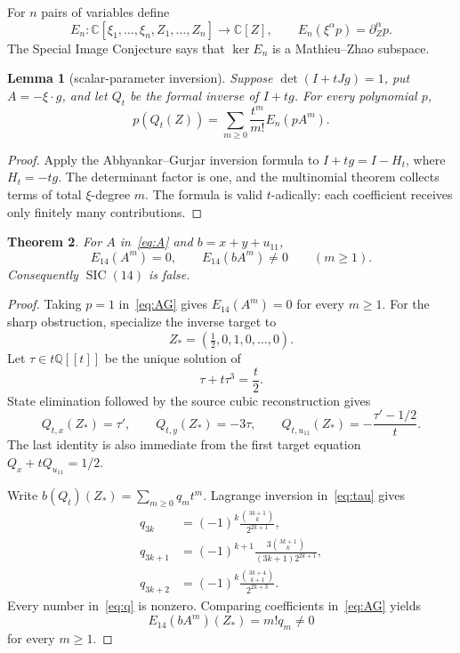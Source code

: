 \documentclass[11pt]{article}
\newtheorem{theorem}{Theorem}
\newtheorem{lemma}[theorem]{Lemma}
\newcommand{\C}{\mathbb C}
\newcommand{\Q}{\mathbb Q}
\newcommand{\SIC}{\operatorname{SIC}}
\begin{document}
For $n$ pairs of variables define
\[
 E_n:\C[\xi_1,\ldots,\xi_n,Z_1,\ldots,Z_n]\longrightarrow\C[Z],
 \qquad E_n(\xi^\alpha p)=\partial_Z^\alpha p.
\]
The Special Image Conjecture says that $\ker E_n$ is a Mathieu--Zhao
subspace.

\begin{lemma}[scalar-parameter inversion]\label{lem:inverse}
Suppose $\det(I+tJg)=1$, put $A=-\xi\cdot g$, and let $Q_t$ be the formal
inverse of $I+tg$.  For every polynomial $p$,
\begin{equation}
 p(Q_t(Z))=\sum_{m\geq0}\frac{t^m}{m!}E_n(pA^m). \label{eq:AG}
\end{equation}
\end{lemma}

\begin{proof}
Apply the Abhyankar--Gurjar inversion formula to
$I+tg=I-H_t$, where $H_t=-tg$.  The determinant factor is one, and the
multinomial theorem collects terms of total $\xi$-degree $m$.  The formula
is valid $t$-adically: each coefficient receives only finitely many
contributions.
\end{proof}

\begin{theorem}\label{thm:SIC}
For $A$ in~\eqref{eq:A} and $b=x+y+u_{11}$,
\[
 E_{14}(A^m)=0,\qquad E_{14}(bA^m)\ne0
 \qquad(m\geq1).
\]
Consequently $\SIC(14)$ is false.
\end{theorem}

\begin{proof}
Taking $p=1$ in~\eqref{eq:AG} gives $E_{14}(A^m)=0$ for every $m\geq1$.
For the sharp obstruction, specialize the inverse target to
\[
 Z_*=(\tfrac12,0,1,0,\ldots,0).
\]
Let $\tau\in t\Q[[t]]$ be the unique solution of
\begin{equation}
 \tau+t\tau^3=\frac t2. \label{eq:tau}
\end{equation}
State elimination followed by the source cubic reconstruction gives
\[
 Q_{t,x}(Z_*)=\tau',\qquad
 Q_{t,y}(Z_*)=-3\tau,\qquad
 Q_{t,u_{11}}(Z_*)=-\frac{\tau'-1/2}{t}.
\]
The last identity is also immediate from the first target equation
$Q_x+tQ_{u_{11}}=1/2$.

Write $b(Q_t)(Z_*)=\sum_{m\geq0}q_mt^m$.  Lagrange inversion
in~\eqref{eq:tau} gives
\begin{align}
q_{3k}&=(-1)^k\frac{\binom{3k+1}{k}}{2^{2k+1}},\nonumber\\
q_{3k+1}&=(-1)^{k+1}
 \frac{3\binom{3k+1}{k}}{(3k+1)2^{2k+1}},\nonumber\\
q_{3k+2}&=(-1)^k\frac{\binom{3k+4}{k+1}}{2^{2k+3}}. \label{eq:q}
\end{align}
Every number in~\eqref{eq:q} is nonzero.  Comparing coefficients
in~\eqref{eq:AG} yields
\[
 E_{14}(bA^m)(Z_*)=m!q_m\ne0
\]
for every $m\geq1$.
\end{proof}
\end{document}
